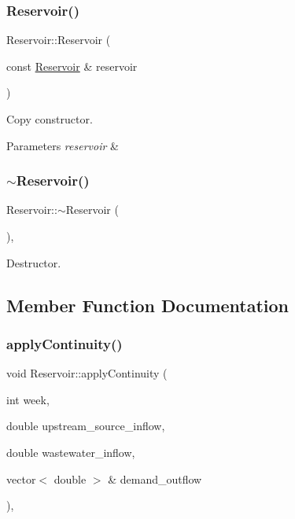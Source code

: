 \subsubsection{\texorpdfstring{Reservoir()}{Reservoir()}\hspace{0.1cm}{\footnotesize\ttfamily [9/9]}}
{\footnotesize\ttfamily Reservoir\+::\+Reservoir (\begin{DoxyParamCaption}\item[{const \mbox{\hyperlink{classReservoir}{Reservoir}} \&}]{reservoir }\end{DoxyParamCaption})}

Copy constructor. 
\begin{DoxyParams}{Parameters}
{\em reservoir} & \\
\hline
\end{DoxyParams}
\mbox{\label{classReservoir_a2f8bfdc73c7470185775a940fb3531de}} 
\subsubsection{\texorpdfstring{$\sim$\+Reservoir()}{~Reservoir()}}
{\footnotesize\ttfamily Reservoir\+::$\sim$\+Reservoir (\begin{DoxyParamCaption}{ }\end{DoxyParamCaption})\hspace{0.3cm}{\ttfamily [override]}, {\ttfamily [default]}}

Destructor. 

\subsection{Member Function Documentation}
\mbox{\label{classReservoir_a66929c055193785bc9d47bcdf0bc7445}} 
\subsubsection{\texorpdfstring{apply\+Continuity()}{applyContinuity()}}
{\footnotesize\ttfamily void Reservoir\+::apply\+Continuity (\begin{DoxyParamCaption}\item[{int}]{week,  }\item[{double}]{upstream\+\_\+source\+\_\+inflow,  }\item[{double}]{wastewater\+\_\+inflow,  }\item[{vector$<$ double $>$ \&}]{demand\+\_\+outflow }\end{DoxyParamCaption})\hspace{0.3cm}{\ttfamily [override]}, {\ttfamily [virtual]}}

